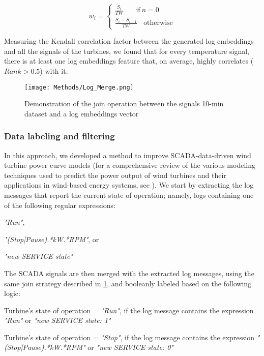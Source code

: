     \begin{equation}
      w_i = \begin{cases}
        \frac{S_i}{TW}\ \ \ \ \ \ \ \ \text{if}\ n = 0\\
        \frac{S_i - S_{i-1}}{TW}\ \ \ \ \text{otherwise}
      \end{cases}
    \end{equation}


    Measuring the Kendall correlation factor between the generated log embeddings and all the signals of the turbines, we found that for every temperature signal, there is at least 
    one log embeddings feature that, on average, highly correlates ($Rank>0.5$) with it.

    \begin{figure}[H]
      \begin{center}
        \texttt{[image: Methods/Log\_Merge.png]}
      \end{center}
      \caption{Demonstration of the join operation between the signals 10-min dataset and a log embeddings vector}
      \label{fig:log-merge}
    \end{figure}

    \subsubsection{Data labeling and filtering}
    \label{subsub:PC}
      In this approach, we developed a method to improve SCADA-data-driven wind turbine power curve models 
      (for a comprehensive review of the various modeling techniques used to predict the power output of wind turbines and their applications in wind-based energy systems, 
      see \cite{Power_curves}). We start by extracting the log messages that report the current state of operation; namely, logs containing one of the following regular expressions:
      \begin{bulletList}
        \item \emph{"Run"},
        \item \emph{"(Stop|Pause).*kW.*RPM"}, or
        \item \emph{"new SERVICE state"}
      \end{bulletList}
      The SCADA signals are then merged with the extracted log messages, using the same join strategy described in \ref{fig:log-merge}, and booleanly labeled based on the following logic:
      \begin{bulletList}
        \item Turbine's state of operation = \emph{"Run"}, if the log message contains the expression \emph{"Run"} or \emph{"new SERVICE state: 1"}
        \item Turbine's state of operation = \emph{"Stop"}, if the log message contains the expression \emph{"(Stop|Pause).*kW.*RPM"} or \emph{"new SERVICE state: 0"}
      \end{bulletList}

